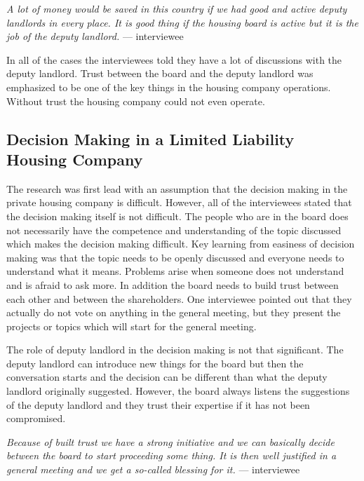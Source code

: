 \begin{displayquote}
\textit{A lot of money would be saved in this country if we had good
and active deputy landlords in every place. It is good thing if the
housing board is active but it is the job of the deputy landlord.} --- interviewee
\end{displayquote}

In all of the cases the interviewees told they have a lot of discussions with the deputy landlord. Trust between the board and the deputy landlord was emphasized to be one of the key things in the housing company operations. Without trust the housing company could not even operate.

\subsection{Decision Making in a Limited Liability Housing Company}

The research was first lead with an assumption that the decision making in the private housing company is difficult. However, all of the interviewees stated that the decision making itself is not difficult. The people who are in the board does not necessarily have the competence and understanding of the topic discussed which makes the decision making difficult. Key learning from easiness of decision making was that the topic needs to be openly discussed and everyone needs to understand what it means. Problems arise when someone does not understand and is afraid to ask more. In addition the board needs to build trust between each other and between the shareholders. One interviewee pointed out that they actually do not vote on anything in the general meeting, but they present the projects or topics which will start for the general meeting.

The role of deputy landlord in the decision making is not that significant. The deputy landlord can introduce new things for the board but then the conversation starts and the decision can be different than what the deputy landlord originally suggested. However, the board always listens the suggestions of the deputy landlord and they trust their expertise if it has not been compromised.

\begin{displayquote}
\textit{Because of built trust we have a strong initiative and we can basically decide between the board to start proceeding some thing. It is then well justified in a general meeting and we get a so-called blessing for it.} --- interviewee
\end{displayquote}

